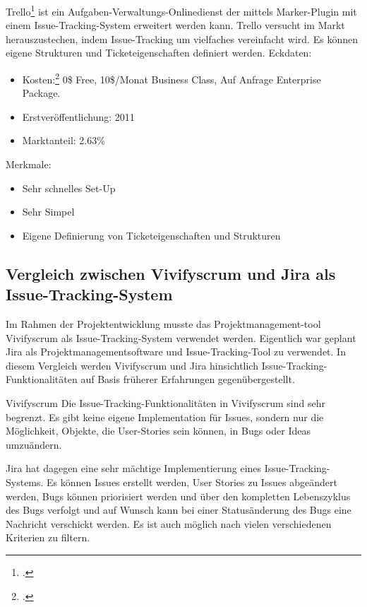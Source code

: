 Trello\footcite{trello} ist ein Aufgaben-Verwaltungs-Onlinedienst der mittels Marker-Plugin mit einem Issue-Tracking-System erweitert werden kann. Trello versucht im Markt herauszustechen, indem Issue-Tracking um vielfaches vereinfacht wird. Es können eigene Strukturen und Ticketeigenschaften definiert werden. 
Eckdaten:
\begin{itemize}
	\item Kosten:\footcite{trello-pricing} 0\$ Free, 10\$/Monat Business Class, Auf Anfrage Enterprise Package.
	\item Erstveröffentlichung: 2011
	\item Marktanteil: 2.63\%
\end{itemize}		
Merkmale:
\begin{itemize}
	\item Sehr schnelles Set-Up
	\item Sehr Simpel
	\item Eigene Definierung von Ticketeigenschaften und Strukturen
\end{itemize}
\newpage
\subsection{Vergleich zwischen Vivifyscrum und Jira als Issue-Tracking-System}
Im Rahmen der Projektentwicklung musste das Projektmanagement-tool Vivifyscrum als Issue-Tracking-System verwendet werden. Eigentlich war geplant Jira als Projektmanagementsoftware und Issue-Tracking-Tool zu verwendet. In diesem Vergleich werden Vivifyscrum und Jira hinsichtlich Issue-Tracking-Funktionalitäten auf Basis früherer Erfahrungen gegenübergestellt. 

Vivifyscrum
Die Issue-Tracking-Funktionalitäten in Vivifyscrum sind sehr begrenzt. Es gibt keine eigene Implementation für Issues, sondern nur die Möglichkeit, Objekte, die User-Stories sein können, in Bugs oder Ideas umzuändern.

Jira hat dagegen eine sehr mächtige Implementierung eines Issue-Tracking-Systems. Es können Issues erstellt werden, User Stories zu Issues abgeändert werden, Bugs können priorisiert werden und über den kompletten Lebenszyklus des Bugs verfolgt und auf Wunsch kann bei einer Statusänderung des Bugs eine Nachricht verschickt werden. Es ist auch möglich nach vielen verschiedenen Kriterien zu filtern.  